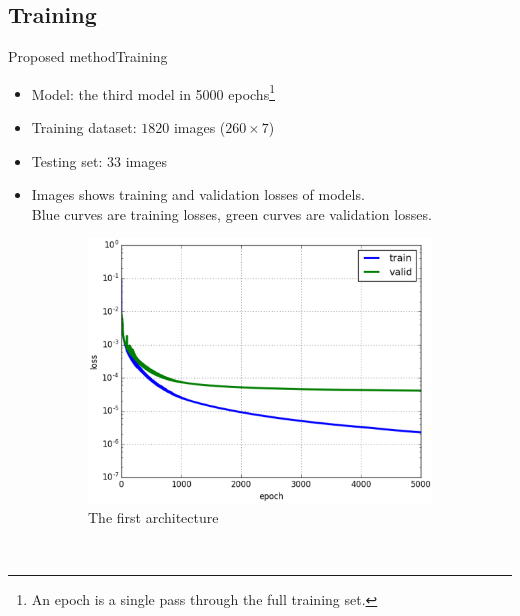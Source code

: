 \documentclass[10pt]{beamer}
\begin{document}
\subsection{Training}
\begin{frame}{Proposed method}{Training}
	\begin{itemize}
		\item Model: the third model in 5000 epochs\footnote{\tiny{An epoch is a single pass through the full training set.}}
		\item Training dataset: $1820$ images ($260 \times 7$)
		\item Testing set: $33$ images
		\item Images shows training and validation losses of models.\\ \small{{\color{blue}Blue} curves are training losses, {\color{green}green} curves are validation losses.}
	\end{itemize}
	\begin{figure}[htbp]
   				\begin{subfigure}[t]{0.5\textwidth}
        			\centering
        			\includegraphics[scale=.2]{images/loss_model_1}
        			\caption{\scriptsize{The first architecture}}
        			\label{figsub11}
    			\end{subfigure}%
    			~ 
    			\begin{subfigure}[t]{0.5\textwidth}
        			\centering

\end{subfigure}
\end{figure}
\end{frame}
\end{document}
